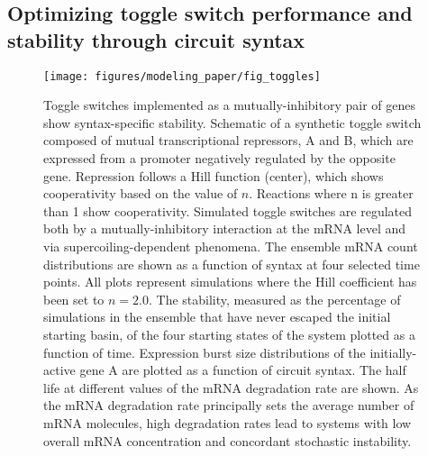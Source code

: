 \documentclass[11pt]{article}
\begin{document}
\subsection{Optimizing toggle switch performance and stability through circuit syntax}
\begin{figure}[htbp]
    \centering
    {\texttt{[image: figures/modeling\_paper/fig\_toggles]}
    \label{fig:toggle_cartoon}
    \label{fig:toggle_basin_stability_over_time}
    \label{fig:toggle_stable_frac_n_2.0}
    \label{fig:toggle_burst_size}
    \label{fig:toggle_half_life_vs_mRNA_deg}
    }
\end{figure}
\begin{figure}[htbp]
    \ContinuedFloat
    \caption{Toggle switches implemented as a mutually-inhibitory pair of genes show syntax-specific stability.
     Schematic of a synthetic toggle switch composed of mutual transcriptional repressors, A and B, which are expressed from a promoter negatively regulated by the opposite gene. Repression follows a Hill function (center), which shows cooperativity based on the value of \(n\). Reactions where n is greater than 1 show cooperativity. Simulated toggle switches are regulated both by a mutually-inhibitory interaction at the mRNA level and via supercoiling-dependent phenomena.
     The ensemble mRNA count distributions are shown as a function of syntax at four selected time points.   All plots represent simulations where the Hill coefficient has been set to \(n = 2.0\).
     The stability, measured as the percentage of simulations in the ensemble that have never escaped the initial starting basin, of the four starting states of the system plotted as a function of time. 
     Expression burst size distributions of the initially-active gene A are plotted as a function of circuit syntax. 
     The half life at different values of the mRNA degradation rate are shown. As the mRNA degradation rate principally sets the average number of mRNA molecules, high degradation rates lead to systems with low overall mRNA concentration and concordant stochastic instability.
} \label{fig:top:toggle_switch}
\end{figure}
\end{document}
